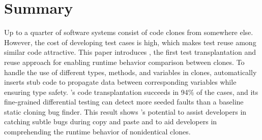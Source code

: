\section{Summary}
\label{sec:summary}
Up to a quarter of software systems consist of code clones from somewhere else. However, the cost of developing test cases is high, which makes test reuse among similar code attractive. This paper introduces {\grafter}, the first test transplantation and reuse approach for enabling runtime behavior comparison between clones. To handle the use of different types, methods, and variables in clones, {\grafter} automatically inserts stub code to propagate data between corresponding variables while ensuring type safety. {\grafter}'s code transplantation succeeds in 94\% of the cases, and its fine-grained differential testing can detect more seeded faults than a baseline static cloning bug finder. This result shows {\grafter}'s potential to assist developers in catching subtle bugs during copy and paste and to aid developers in comprehending the runtime behavior of nonidentical clones. 